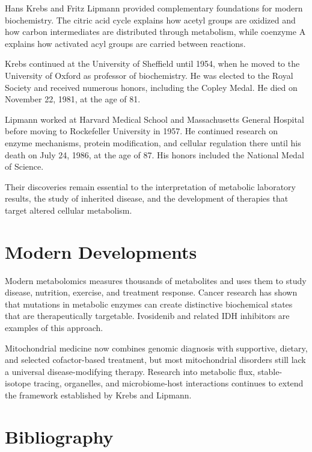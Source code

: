 Hans Krebs and Fritz Lipmann provided complementary foundations for modern biochemistry. The citric acid cycle explains how acetyl groups are oxidized and how carbon intermediates are distributed through metabolism, while coenzyme A explains how activated acyl groups are carried between reactions.

Krebs continued at the University of Sheffield until 1954, when he moved to the University of Oxford as professor of biochemistry. He was elected to the Royal Society and received numerous honors, including the Copley Medal. He died on November 22, 1981, at the age of 81.

Lipmann worked at Harvard Medical School and Massachusetts General Hospital before moving to Rockefeller University in 1957. He continued research on enzyme mechanisms, protein modification, and cellular regulation there until his death on July 24, 1986, at the age of 87. His honors included the National Medal of Science.

Their discoveries remain essential to the interpretation of metabolic laboratory results, the study of inherited disease, and the development of therapies that target altered cellular metabolism.

\section{Modern Developments}

Modern metabolomics measures thousands of metabolites and uses them to study disease, nutrition, exercise, and treatment response. Cancer research has shown that mutations in metabolic enzymes can create distinctive biochemical states that are therapeutically targetable. Ivosidenib and related IDH inhibitors are examples of this approach.

Mitochondrial medicine now combines genomic diagnosis with supportive, dietary, and selected cofactor-based treatment, but most mitochondrial disorders still lack a universal disease-modifying therapy. Research into metabolic flux, stable-isotope tracing, organelles, and microbiome-host interactions continues to extend the framework established by Krebs and Lipmann.

\section{Bibliography}

